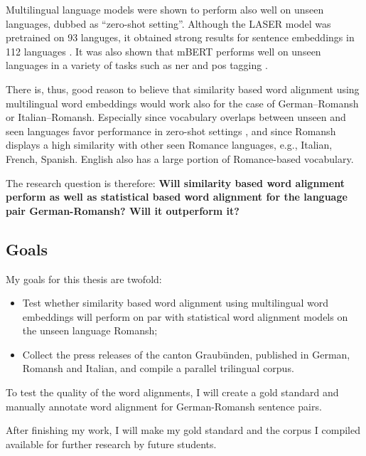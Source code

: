 Multilingual language models were shown to perform also well on unseen languages, dubbed as \enquote{zero-shot setting}. 
Although the LASER model was pretrained on 93 languges, it obtained strong results for sentence embeddings in 112 languages \autocite{artexte-schwenk-2019-laser}. 
It was also shown that mBERT performs well on unseen languages in a variety of tasks such as \acrfull{ner} and \acrfull{pos} tagging \autocite{pires-etal-2019-multilingual}.

There is, thus, good reason to believe that similarity based word alignment using multilingual word embeddings would work also for the case of German--Romansh or Italian--Romansh. 
Especially since vocabulary overlaps between unseen and seen languages favor performance in zero-shot settings \autocite{pires-etal-2019-multilingual}, and since Romansh displays a high similarity with other seen Romance languages, e.g., Italian, French, Spanish. 
English also has a large portion of Romance-based vocabulary.

The research question is therefore: \textbf{Will similarity based word alignment perform as well as statistical based word alignment for the language pair German-Romansh? 
Will it outperform it?}



\subsection{Goals}
My goals for this thesis are twofold:
\begin{itemize}
	\item Test whether similarity based word alignment using multilingual word embeddings will perform on par with statistical word alignment models on the unseen language Romansh;

	\item Collect the press releases of the canton Graubünden, published in German, Romansh and Italian, and compile a parallel trilingual corpus. 

\end{itemize}
To test the quality of the word alignments, I will create a gold standard and manually annotate word alignment for German-Romansh sentence pairs.

After finishing my work, I will make my gold standard and the corpus I compiled available for further research by future students.

